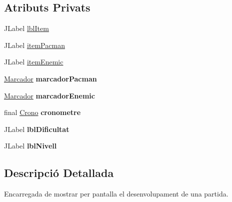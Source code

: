 \subsection*{Atributs Privats}
\begin{DoxyCompactItemize}
\item 
J\+Label \hyperlink{classinterficie_1_1_f_partida_aa4a2e728714a1b1cf9afc70a8b91f808}{lbl\+Item}
\item 
J\+Label \hyperlink{classinterficie_1_1_f_partida_af864c7289d6462d5c8b4742047f32b57}{item\+Pacman}
\item 
J\+Label \hyperlink{classinterficie_1_1_f_partida_abe23e279e0547f67d0e228cc8bdf4c21}{item\+Enemic}
\item 
\hypertarget{classinterficie_1_1_f_partida_ad6192b1930a75625361126ac59ace899}{\hyperlink{classinterficie_1_1components_1_1_marcador}{Marcador} {\bfseries marcador\+Pacman}}\label{classinterficie_1_1_f_partida_ad6192b1930a75625361126ac59ace899}

\item 
\hypertarget{classinterficie_1_1_f_partida_aae6093a9a53afad8fb2cda1e9346586b}{\hyperlink{classinterficie_1_1components_1_1_marcador}{Marcador} {\bfseries marcador\+Enemic}}\label{classinterficie_1_1_f_partida_aae6093a9a53afad8fb2cda1e9346586b}

\item 
\hypertarget{classinterficie_1_1_f_partida_ab7326d4e9ea0121c333ddce978d8751e}{final \hyperlink{classinterficie_1_1components_1_1_crono}{Crono} {\bfseries cronometre}}\label{classinterficie_1_1_f_partida_ab7326d4e9ea0121c333ddce978d8751e}

\item 
\hypertarget{classinterficie_1_1_f_partida_a8c2ac895b436184f9799432c16ce36e4}{J\+Label {\bfseries lbl\+Dificultat}}\label{classinterficie_1_1_f_partida_a8c2ac895b436184f9799432c16ce36e4}

\item 
\hypertarget{classinterficie_1_1_f_partida_ab863a7417c722e7b4c162b48f08e82eb}{J\+Label {\bfseries lbl\+Nivell}}\label{classinterficie_1_1_f_partida_ab863a7417c722e7b4c162b48f08e82eb}

\end{DoxyCompactItemize}


\subsection{Descripció Detallada}
Encarregada de mostrar per pantalla el desenvolupament de una partida. 

